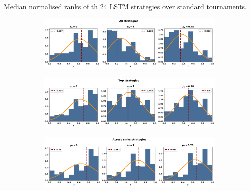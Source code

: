 \begin{table}[!htbp]
    \begin{center}
    \resizebox{.9\textwidth}{!}{
        
    }
\end{center}
\caption{Median normalised ranks of th 24 LSTM strategies over standard tournaments.}
\end{table}

\begin{figure}[!htbp]
    \begin{subfigure}{\textwidth}
    \includegraphics[width=\textwidth]{src/chapters/07/img/normalised_rank_all_strategies.pdf}
    \end{subfigure}
    \par\bigskip
    \begin{subfigure}{\textwidth}
    \includegraphics[width=\textwidth]{src/chapters/07/img/normalised_rank_top_strategies.pdf}
    \end{subfigure}
    \par\bigskip
    \begin{subfigure}{\textwidth}
    \includegraphics[width=\textwidth]{src/chapters/07/img/normalised_rank_across_ranks_strategies.pdf}
    \end{subfigure}

\end{figure}
